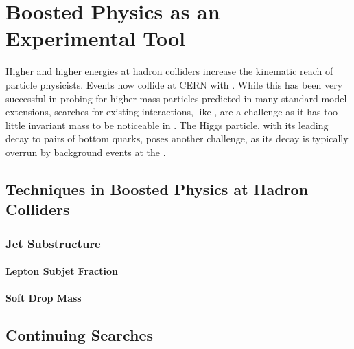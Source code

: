 \chapter{Boosted Physics as an Experimental Tool}
\label{ch:boost}

Higher and higher energies at hadron colliders increase the kinematic reach of particle physicists.  Events now collide at CERN with \rootsthirteen.  While this has been very successful in probing for higher mass particles predicted in many standard model extensions, searches for existing interactions, like \jpsi , are a challenge as it has too little invariant mass to be noticeable in \CMS.  The Higgs particle, with its leading decay to pairs of bottom quarks, poses another challenge, as its decay is typically overrun by background events at the \LHC.


\section{Techniques in Boosted Physics at Hadron Colliders}

\subsection{Jet Substructure}

\subsubsection{Lepton Subjet Fraction}

\subsubsection{Soft Drop Mass}

\section{Continuing Searches}


